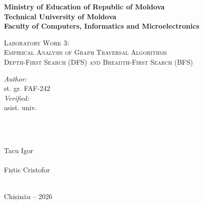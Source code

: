 \documentclass[12pt]{article}
\begin{document}
\begin{titlepage}
  \begin{center}
    \textbf{\large Ministry of Education of Republic of Moldova}\\[0.1cm]
    \textbf{\large Technical University of Moldova}\\[0.1cm]
    \textbf{\large Faculty of Computers, Informatics and Microelectronics}\\[1.2cm]

    \vspace{40mm}

    \textsc{\Large Laboratory Work 3:}\\[0.2cm]
    \textsc{\Large Empirical Analysis of Graph Traversal Algorithms}\\[0.2cm]
    \textsc{\large Depth-First Search (DFS) and Breadth-First Search (BFS)}\\[0.4cm]

    \vspace{65mm}

    \begin{minipage}[t]{0.4\textwidth}
      \begin{flushleft}\large
        \emph{Author:}\\
        st. gr. FAF-242\\[0.4cm]
        \emph{Verified:}\\
        asist. univ.
      \end{flushleft}
    \end{minipage}
    ~
    \begin{minipage}[t]{0.4\textwidth}
      \begin{flushright}\large
        \emph{}\\
        Tacu Igor\\[0.4cm]
        \emph{}\\
        Fiștic Cristofor
      \end{flushright}
    \end{minipage}\\[2cm]

    \vspace{5mm}
    \large Chișinău -- 2026

    \vfill
  \end{center}
\end{titlepage}

\clearpage
\thispagestyle{empty}
\tableofcontents
\end{document}
